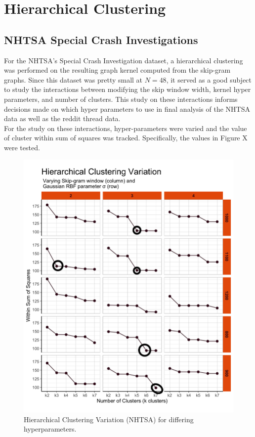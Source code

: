 %
%
%

\section{Hierarchical Clustering}


\subsection{NHTSA Special Crash Investigations}
 For the NHTSA's Special Crash Investigation dataset, a hierarchical clustering was performed on the resulting graph kernel computed from the skip-gram graphs. Since this dataset was pretty small at $N=48$, it served as a good subject to study the interactions between modifying the skip window width, kernel hyper parameters, and number of clusters. This study on these interactions informs decisions made on which hyper parameters to use in final analysis of the NHTSA data as well as the reddit thread data. \\
 
For the study on these interactions, hyper-parameters were varied and the value of cluster within sum of squares was tracked. Specifically, the values in Figure X were tested. \\
 

\begin{figure}
\includegraphics[width=6in]{Content/Images/hclust_variation.png}
\caption{Hierarchical Clustering Variation (NHTSA) for differing hyperparameters.}
\end{figure}

